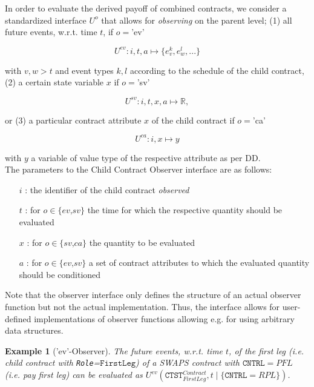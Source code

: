 \documentclass[9pt,oneside]{amsart}
\newtheorem{example}{Example}
\newcommand{\Real}{\mathbb{R}}
\newcommand{\attr}[1]{\texttt{#1}}
\newcommand{\cldev}[3]{U^{ev}(#1,#2 \mid\{#3\})}
\newcommand{\cldfunc}[1]{U^{#1}}
\begin{document}
\begin{multicols}{2}
In order to evaluate the derived payoff of combined contracts, we consider a standardized interface $\cldfunc{o}$ that allows for \textit{observing} on the parent level; (1) all future events, w.r.t. time $t$, if $o=$'ev'

\[
	\cldfunc{ev}: i,t,a \mapsto \{e_v^{k},e_w^{l},...\}
\]

with $v,w>t$ and event types $k,l$ according to the schedule of the child contract, (2) a certain state variable $x$ if $o=$'sv'

\[
	\cldfunc{sv}: i,t,x,a \mapsto \Real,
\]

or (3) a particular contract attribute $x$ of the child contract if $o=$'ca'

\[
	\cldfunc{ca}: i,x \mapsto y
\]

with $y$ a variable of value type of the respective attribute as per DD.\\

The parameters to the Child Contract Observer interface are as follows:

\begin{itemize}
	\item[$i$]: the identifier of the child contract \textit{observed}

	\item[$t$]: for $o\in\{\textit{ev,sv}\}$ the time for which the respective quantity should be evaluated

	\item [$x$]: for $o\in\{\textit{sv,ca}\}$ the quantity to be evaluated

	\item [$a$]: for $o\in\{\textit{ev,sv}\}$ a set of contract attributes to which the evaluated quantity should be conditioned
\end{itemize}


Note that the observer interface only defines the structure of an actual observer function but not the actual implementation. Thus, the interface allows for user-defined implementations of observer functions allowing e.g. for using arbitrary data structures.

\begin{example}['ev'-Observer] The future events, w.r.t. time $t$, of the \textit{first leg} (i.e. child contract with \verb'Role'=$\texttt{FirstLeg}$) of a SWAPS contract with $\attr{CNTRL}=PFL$ (i.e. \textit{pay first leg}) can be evaluated as $\cldev{\attr{CTST}_{FirstLeg}^{Contract}}{t}{\attr{CNTRL}=RPL}$.
\end{example}


\end{multicols}
\end{document}
